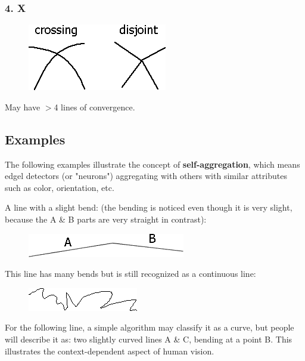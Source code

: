 \subsubsection{4. X}

\begin{figure}[H]
\centering
\includegraphics[scale=0.7, bb=0 0 230 110]{Junctions-X.PNG}
\end{figure}

May have $>$4 lines of convergence.

\subsection{Examples}

The following examples illustrate the concept of \textbf{self-aggregation}, which means edgel detectors (or "neurons") aggregating with others with similar attributes such as color, orientation, etc.

A line with a slight bend: (the bending is noticed even though it is very slight, because the A \& B parts are very straight in contrast):

\begin{figure}[H]
\centering
\includegraphics[scale=0.7, bb=0 0 260 39]{Line1.PNG}
\end{figure}

This line has many bends but is still recognized as a continuous line: 

\begin{figure}[H]
\centering
\includegraphics[scale=0.7, bb=0 0 182 38]{Line2.PNG}
\end{figure}

For the following line, a simple algorithm may classify it as a curve, but people will describe it as: two slightly curved lines A \& C, bending at a point B. This illustrates the context-dependent aspect of human vision.

